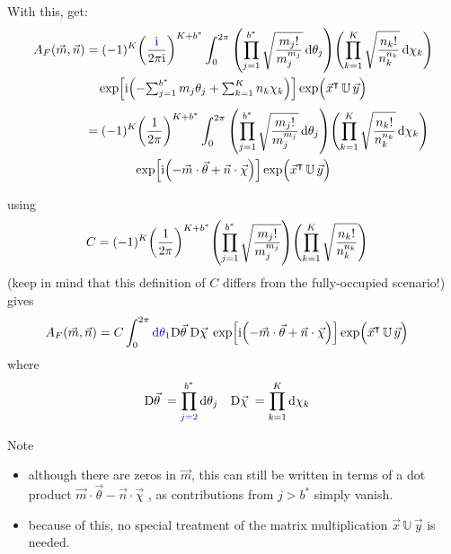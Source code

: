 \documentclass[
	english,
	a4paper,
	fontsize=10pt,
	parskip=half,
	titlepage=true,
	DIV=12,
	final
]{scrreprt}
\newcommand*{\transp}{\ensuremath{^\intercal}}
\newcommand*{\iunit}{\ensuremath{\mathrm{i}}}
\newcommand*{\DD}[1]{\ensuremath{\text{D}\vec{#1}\;}}
\begin{document}
With this, get:
\begin{multline}
	A_F(\vec{m}, \vec{n})
=
	(-1)^K
	\qty(
		\frac{{\color{blue}\iunit}}{2\pi\iunit}
	)^{K + b^*}
	\int_{0}^{2\pi}
		\qty( \prod_{j=1}^{b^*}
			\sqrt{\frac
				{ m_j! }
				{ m_j^{m_j} }
			}\dd{\theta_j}
		)
		\qty( \prod_{k=1}^{K}
			\sqrt{\frac
				{ n_k! }
				{ n_k^{n_k} }
			}\dd{\chi_k}
		)
\\
			\exp[
				\iunit \qty(
				-{\textstyle \sum_{j=1}^{b^*} m_j \theta_j}
				+{\textstyle \sum_{k=1}^{K}   n_k \chi  _k}
			)]
			\exp( \Big. \vec{x}\transp \, \mathbb{U} \, \vec{y})
\end{multline}
\begin{multline}
	\qquad\qquad
=
	(-1)^K
	\qty(
		\frac{1}{2\pi}
	)^{K + b^*}
	\int_{0}^{2\pi}
		\qty( \prod_{j=1}^{b^*}
			\sqrt{\frac
				{ m_j! }
				{ m_j^{m_j} }
			} \dd{\theta_j}
		)
		\qty( \prod_{k=1}^{K}
			\sqrt{\frac
				{ n_k! }
				{ n_k^{n_k} }
			} \dd{\chi_k}
		)
\\
		\exp[
			\iunit \qty(
			-\vec{m} \cdot \vec{\theta}
			+\vec{n} \cdot \vec{\chi}
		)]
		\exp( \Big. \vec{x}\transp \, \mathbb{U} \, \vec{y})
\end{multline}

using
\begin{align}
	C
&=
	(-1)^K
	\qty(
		\frac{1}{2\pi}
	)^{K + b^*}
	\qty( \prod_{j=1}^{b^*}
		\sqrt{\frac
			{ m_j! }
			{ m_j^{m_j} }
		}
	)
	\qty( \prod_{k=1}^{K}
		\sqrt{\frac
			{ n_k! }
			{ n_k^{n_k} }
		}
	)
\label{eqn:DefC_m}
\end{align}
({\color{red}keep in mind that this definition of $C$ differs from the fully-occupied scenario!})
gives
\begin{align}
	A_F(\vec{m}, \vec{n})
&=
	C
	\int_{0}^{2\pi}
		{\color{blue} \dd{\theta_1}}
		\DD{\theta}
		\DD{\chi  }
			\exp[
				\iunit \qty(
				-\vec{m} \cdot \vec{\theta}
				+\vec{n} \cdot \vec{\chi}
			)]
			\exp( \Big. \vec{x}\transp \, \mathbb{U} \, \vec{y})
	\label{eqn:BSA_Int_BZO_Polar_m}
\end{align}
where
\begin{align}
	\DD{\theta}
&=
	\prod_{{\color{blue} j=2}}^{b^*} \dd{\theta_j}
&
	\DD{\chi}
&=
	\prod_{k=1}^{K}   \dd{\chi  _k}
\end{align}

Note
\begin{itemize}
\item although there are zeros in $\vec{m}$, this can still be written in terms of a dot product
	$\vec{m} \cdot \vec{\theta} - \vec{n} \cdot \vec{\chi}$
	, as contributions from $j > b^*$ simply vanish.
\item because of this, no special treatment of the matrix multiplication $\vec{x} \, \mathbb{U} \, \vec{y}$ is needed.
\end{itemize}
\end{document}
